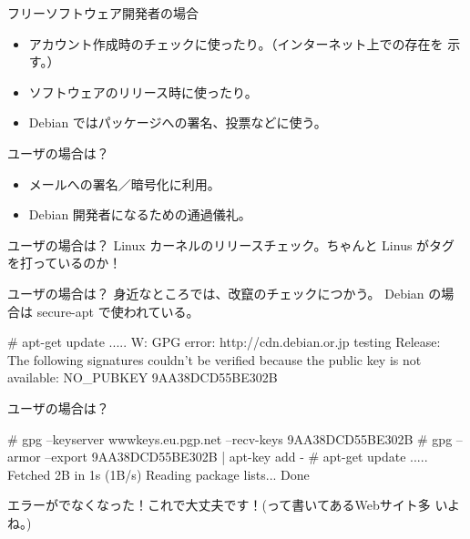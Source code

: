 \begin{frame}{フリーソフトウェア開発者の場合}
\begin{itemize}
\item アカウント作成時のチェックに使ったり。（インターネット上での存在を
      示す。）
\item ソフトウェアのリリース時に使ったり。
\item Debian ではパッケージへの署名、投票などに使う。
\end{itemize}
\end{frame}

\begin{frame}[containsverbatim]{ユーザの場合は？}
\begin{itemize}
\item メールへの署名／暗号化に利用。
\item Debian 開発者になるための通過儀礼。
\end{itemize}
\end{frame}

\begin{frame}[containsverbatim]{ユーザの場合は？}
Linux カーネルのリリースチェック。ちゃんと Linus がタグを打っているのか！
\end{frame}

\begin{frame}[containsverbatim]{ユーザの場合は？}
身近なところでは、改竄のチェックにつかう。
Debian の場合は secure-apt で使われている。
\begin{commandline}
# apt-get update
.....
W: GPG error: http://cdn.debian.or.jp testing Release: The following
 signatures couldn't be verified because the public key is not
 available: NO_PUBKEY 9AA38DCD55BE302B
\end{commandline}
\end{frame}

\begin{frame}[containsverbatim]{ユーザの場合は？}
\begin{commandline}
# gpg --keyserver wwwkeys.eu.pgp.net --recv-keys 9AA38DCD55BE302B
# gpg --armor --export 9AA38DCD55BE302B | apt-key add -
# apt-get update
.....
Fetched 2B in 1s (1B/s)
Reading package lists... Done
\end{commandline}
エラーがでなくなった！これで大丈夫です！(って書いてあるWebサイト多
 いよね。)
\end{frame}

